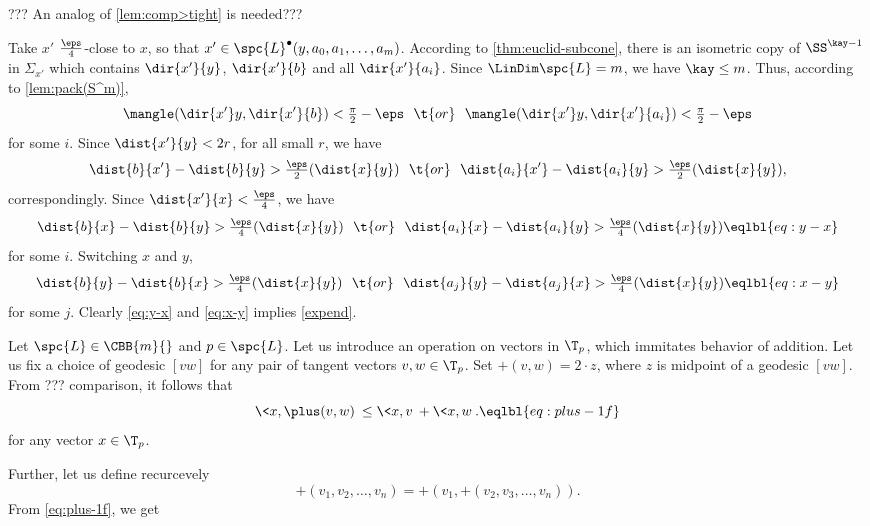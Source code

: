 ??? An analog of \ref{lem:comp>tight} is needed???





















Take $x'$ $\tfrac\eps4$-close to  $x$, 
so that 
$x'\in \spc{L}^\bullet(y,a_0,a_1,\dots,a_m)$.
According to \ref{thm:euclid-subcone}, there is an isometric copy of $\SS^{\kay-1}$ in $\Sigma_{x'}$ which contains $\dir{x'}{y}$, $\dir{x'}{b}$ and all $\dir{x'}{a_i}$.
Since $\LinDim\spc{L}=m$, we have $\kay\le m$.
Thus, according to \ref{lem:pack(S^m)}, $$\mangle(\dir{x'}y,\dir{x'}{b})<\tfrac\pi2-\eps\ \ \t{or}\ \  \mangle(\dir{x'}y,\dir{x'}{a_i})<\tfrac\pi2-\eps$$ 
for some $i$.
Since $\dist{x'}{y}<2r$, for all small $r$, 
we have 
$$\dist{b}{x'}-\dist{b}{y}>\tfrac\eps2(\dist{x}{y})\ \ \t{or}\ \ \dist{a_i}{x'}-\dist{a_i}{y}>\tfrac\eps2(\dist{x}{y}),$$
correspondingly. 
Since $\dist{x'}{x}<\tfrac\eps4$, we have
$$\dist{b}{x}-\dist{b}{y}
>
\tfrac\eps4(\dist{x}{y})
\ \ \t{or}\ \ 
\dist{a_i}{x}-\dist{a_i}{y}
>
\tfrac\eps4(\dist{x}{y})\eqlbl{eq:y-x}$$ for some 
$i$.
Switching $x$ and $y$,
$$\dist{b}{y}-\dist{b}{x}
>
\tfrac\eps4(\dist{x}{y})
\ \ \t{or}\ \ 
\dist{a_j}{y}-\dist{a_j}{x}
>
\tfrac\eps4(\dist{x}{y})\eqlbl{eq:x-y}$$ 
for some $j$.
Clearly \ref{eq:y-x} and \ref{eq:x-y} implies \ref{expend}.\qeds























Let $\spc{L}\in\CBB{m}{}$ and $p\in \spc{L}$. 
Let us introduce an operation on vectors in $\T_p$,
which immitates behavior of addition.
Let us fix a choice of geodesic $[vw]$ for any pair of tangent vectors $v,w\in \T_p$.
Set $\plus(v,w)=2\cdot z$, where $z$ is midpoint of a geodesic $[vw]$.
From ??? comparison, it follows that
$$\<x,\plus(v,w)\>
\le \<x,v\>+\<x,w\>.\eqlbl{eq:plus-1f}$$
for any vector $x\in \T_p$.

Further, let us define recurcevely
$$\plus(v_1,v_2,\dots,v_n)=\plus(v_1,\plus(v_2,v_3,\dots,v_{n})).$$
From \ref{eq:plus-1f}, we get



